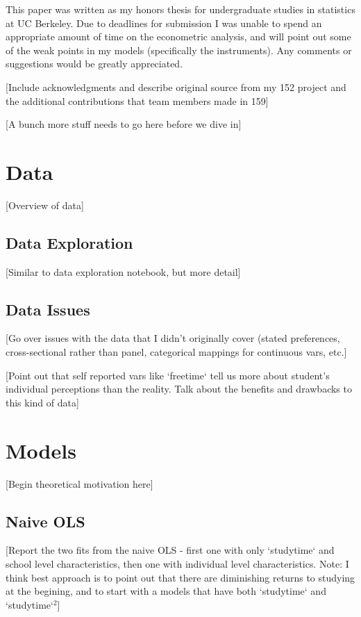 \documentclass[12pt]{article}
\begin{document}
This paper was written as my honors thesis for undergraduate studies in statistics at UC Berkeley. Due to deadlines for submission I was unable to spend an appropriate amount of time on the econometric analysis, and will point out some of the weak points in my models (specifically the instruments). Any comments or suggestions would be greatly appreciated.

[Include acknowledgments and describe original source from my 152 project and the additional contributions that team members made in 159]

\textcolor{BrickRed}{[A bunch more stuff needs to go here before we dive in]}


\newpage
\section{Data}
[Overview of data]

\subsection{Data Exploration}
[Similar to data exploration notebook, but more detail]

\subsection{Data Issues}
[Go over issues with the data that I didn't originally cover (stated preferences, cross-sectional rather than panel, categorical mappings for continuous vars, etc.]

[Point out that self reported vars like `freetime` tell us more about student's individual perceptions than the reality. Talk about the benefits and drawbacks to this kind of data]


\newpage
\section{Models}
[Begin theoretical motivation here]

\subsection{Naive OLS}
[Report the two fits from the naive OLS - first one with only `studytime` and school level characteristics, then one with individual level characteristics. Note: I think best approach is to point out that there are diminishing returns to studying at the begining, and to start with a models that have both `studytime` and `studytime`$^2$]
\end{document}

